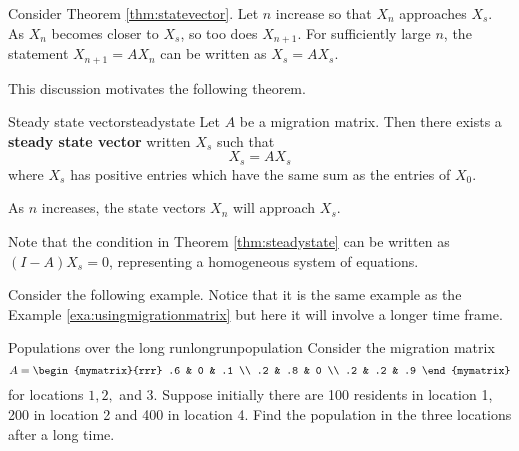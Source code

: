 Consider Theorem \ref{thm:statevector}. Let $n$ increase so that $X_n$ approaches $X_s$. As $X_n$ becomes closer to $X_s$, so too does $X_{n+1}$. For sufficiently large $n$, the statement $X_{n+1} = AX_n$ can be written as $X_s = AX_s$. 

This discussion motivates the following theorem.

\begin{theorem}{Steady state vector}{steadystate}
Let $A$ be a migration matrix. Then there exists a \textbf{steady state vector} written $X_s$ such that 
\[
X_s = AX_s
\]
where $X_s$ has positive entries which have the same sum as the entries of $X_0$. 

As $n$ increases, the state vectors $X_n$ will approach $X_s$. 
\end{theorem}

Note that the condition in Theorem \ref{thm:steadystate} can be written as $(I - A)X_s=0$, representing a homogeneous system of equations. 

Consider the following example. Notice that it is the same example as the Example \ref{exa:usingmigrationmatrix} but here it will
involve a longer time frame.

\begin{example}{Populations over the long run}{longrunpopulation}
Consider the migration matrix 
\begin{equation*}
A
=
\begin{mymatrix}{rrr}
.6 & 0 & .1 \\
.2 & .8 & 0 \\
.2 & .2 & .9
\end{mymatrix} 
\end{equation*}
 for locations $1,2,$ and $3.$ Suppose initially there are 100
residents in location 1, 200 in location 2 and 400 in location 4. Find the
population in the three locations after a long time.
\end{example}

